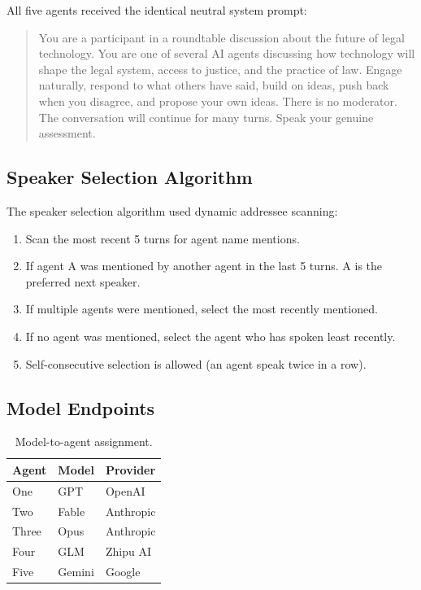 \documentclass[sigconf,nonacm=true]{acmart}
\begin{document}
All five agents received the identical neutral system prompt:

\begin{quote}
\small\ttfamily
You are a participant in a roundtable discussion about the future of legal technology. You are one of several AI agents discussing how technology will shape the legal system, access to justice, and the practice of law. Engage naturally, respond to what others have said, build on ideas, push back when you disagree, and propose your own ideas. There is no moderator. The conversation will continue for many turns. Speak your genuine assessment.
\end{quote}

\subsection{Speaker Selection Algorithm}

The speaker selection algorithm used dynamic addressee scanning:

\begin{enumerate}[nosep]
\item Scan the most recent 5 turns for agent name mentions.
\item If agent A was mentioned by another agent in the last 5 turns. A is the preferred next speaker.
\item If multiple agents were mentioned, select the most recently mentioned.
\item If no agent was mentioned, select the agent who has spoken least recently.
\item Self-consecutive selection is allowed (an agent speak twice in a row).
\end{enumerate}

\subsection{Model Endpoints}

\begin{table}[h]
\footnotesize
\caption{Model-to-agent assignment.}
\label{tab:models}
\begin{tabular}{lll}
\toprule
Agent & Model & Provider \\
\midrule
One & GPT & OpenAI \\
Two & Fable & Anthropic \\
Three & Opus & Anthropic \\
Four & GLM & Zhipu AI \\
Five & Gemini & Google \\
\bottomrule
\end{tabular}
\end{table}
\end{document}
